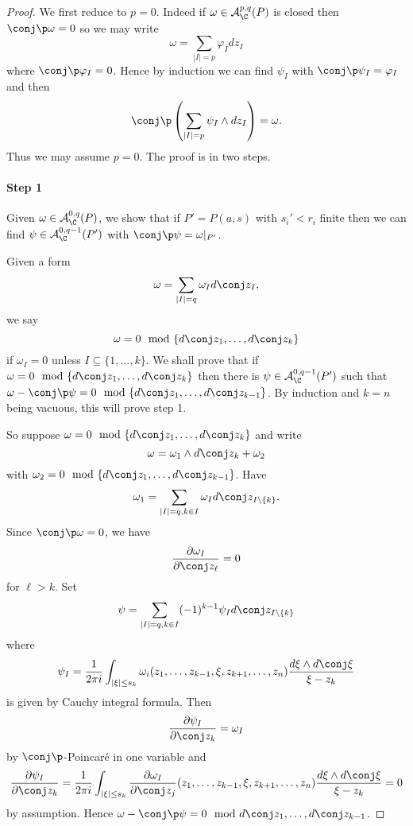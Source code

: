 \documentclass[a4paper]{article}
\newcommand{\w}{\wedge} %
\begin{document}
\begin{proof}
  We first reduce to \(p = 0\). Indeed if \(\omega \in \mathcal A_\C^{p, q}(P)\) is closed then \(\conj \p \omega = 0\) so we may write
  \[
    \omega = \sum_{|I| = p} \varphi_I dz_I
  \]
  where \(\conj \p \varphi_I = 0\). Hence by induction we can find \(\psi_I\) with \(\conj \p \psi_I = \varphi_I\) and then
  \[
    \conj \p \left(\sum_{|I| = p} \psi_I \w dz_I\right) = \omega.
  \]
  Thus we may assume \(p = 0\). The proof is in two steps.

  \paragraph{Step 1}

  Given \(\omega \in \mathcal A_\C^{0, q}(P)\), we show that if \(P' = P(a, s)\) with \(s_i' < r_i\) finite then we can find \(\psi \in \mathcal A_\C^{0, q - 1}(P')\) with \(\conj \p \psi = \omega|_{P'}\).

  Given a form
  \[
    \omega = \sum_{|I| = q} \omega_I d \conj z_I,
  \]
  we say
  \[
    \omega = 0 \mod \{d\conj z_1, \dots, d\conj z_k\}
  \]
  if \(\omega_I = 0\) unless \(I \subseteq \{1, \dots, k\}\). We shall prove that if \(\omega = 0 \mod \{d\conj z_1, \dots, d\conj z_k\}\) then there is \(\psi \in \mathcal A_\C^{0, q - 1}(P')\) such that \(\omega - \conj \p \psi = 0 \mod \{d\conj z_1, \dots, d\conj z_{k - 1}\}\). By induction and \(k = n\) being vacuous, this will prove step 1.

  So suppose \(\omega = 0 \mod \{d\conj z_1, \dots, d\conj z_k\}\) and write
  \[
    \omega = \omega_1 \w d\conj z_k + \omega_2
  \]
  with \(\omega_2 = 0 \mod \{d\conj z_1, \dots, d\conj z_{k - 1}\}\). Have
  \[
    \omega_1 = \sum_{|I| = q, k \in I} \omega_I d \conj z_{I \setminus \{k\}}.
  \]
  Since \(\conj \p \omega = 0\), we have
  \[
    \frac{\partial \omega_I}{\partial \conj z_\ell} = 0
  \]
  for \(\ell > k\). Set
  \[
    \psi = \sum_{|I| = q, k \in I} (-1)^{k - 1} \psi_I d\conj z_{I \setminus \{k\}}
  \]
  where
  \[
    \psi_I = \frac{1}{2\pi i} \int_{|\xi| \leq s_k} \omega_i(z_1, \dots, z_{k - 1}, \xi, z_{k + 1}, \dots, z_n) \frac{d \xi \w d \conj \xi}{\xi - z_k}
  \]
  is given by Cauchy integral formula. Then
  \[
    \frac{\partial \psi_I}{\partial \conj z_k} = \omega_I
  \]
  by \(\conj \p\)-Poincaré in one variable and
 \[
   \frac{\partial \psi_I}{\partial \conj z_k} = \frac{1}{2\pi i} \int_{|\xi| \leq s_k} \frac{\partial \omega_I}{\partial \conj z_j} (z_1, \dots, z_{k - 1}, \xi, z_{k + 1}, \dots, z_n) \frac{d \xi \w d \conj \xi}{\xi - z_k}
   = 0
 \]
 by assumption. Hence \(\omega - \conj \p \psi = 0 \mod d\conj z_1, \dots, d\conj z_{k - 1}\).
  

\end{proof}
\end{document}
